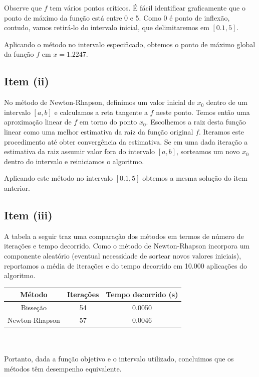\documentclass{article}
\begin{document}
\newpage

Observe que $f$ tem vários pontos críticos. É fácil identificar graficamente que 
o ponto de máximo da função está entre 0 e 5. Como 0 é ponto de inflexão, contudo,
vamos retirá-lo do intervalo inicial, que delimitaremos em $[0.1, 5]$.

Aplicando o método no intervalo especificado, obtemos o ponto de máximo global da 
função $f$ em $x = 1.2247$.

\subsection*{Item (ii)}

No método de Newton-Rhapson, definimos um valor inicial de $x_0$ dentro de
um intervalo $[a,b]$ e calculamos a reta tangente a $f$ neste ponto. 
Temos então uma aproximação linear de $f$ em torno do ponto $x_0$. 
Escolhemos a raiz desta função linear como uma melhor estimativa da raiz 
da função original $f$. Iteramos este procedimento até obter
convergência da estimativa. Se em uma dada iteração a estimativa da raiz 
assumir valor fora do intervalo $[a,b]$, sorteamos um novo $x_0$ 
dentro do intervalo e reiniciamos o algoritmo.

Aplicando este método no intervalo $[0.1, 5]$ obtemos a mesma solução do item anterior.

\subsection*{Item (iii)}

A tabela a seguir traz uma comparação dos métodos em termos de número de iterações e
tempo decorrido. Como o método de Newton-Rhapson incorpora um componente aleatório
(eventual necessidade de sortear novos valores iniciais), reportamos a média de iterações
e do tempo decorrido em 10.000 aplicações do algoritmo. \\

\begin{tabular}{ccc}
 Método   		& Iterações & Tempo decorrido (s) \\ \hline
 Bisseção 		& 	 54     &       0.0050        \\
 Newton-Rhapson & 	 57     &       0.0046  	  \\
\end{tabular} \\ \\

Portanto, dada a função objetivo e o intervalo utilizado, concluimos que os 
métodos têm desempenho equivalente.
\end{document}
